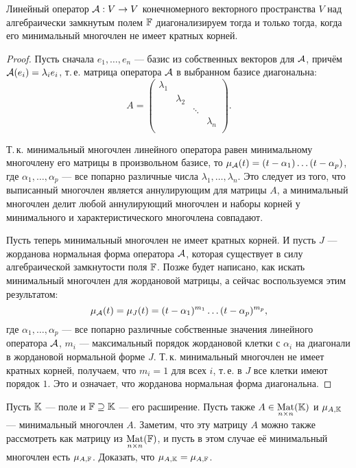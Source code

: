 \begin{theorem}
    Линейный оператор $\mathcal{A}: V \to V$ конечномерного векторного пространства $V$ над алгебраически замкнутым полем $\mathbb{F}$ диагонализируем тогда и только тогда, когда его минимальный многочлен не имеет кратных корней.
\end{theorem}

\begin{proof}
    Пусть сначала $e_1, \ldots, e_n$ --- базис из собственных векторов для $\mathcal{A}$, причём $\mathcal{A}(e_i) = \lambda_ie_i$, т.\,е. матрица оператора $\mathcal{A}$ в выбранном базисе диагональна:
    \[
        A =
        \begin{pmatrix}
            \lambda_1 &  &  & \\
             & \lambda_2 &  &  \\
             &  & \ddots &  \\
             &  &  & \lambda_n \\
        \end{pmatrix}.
    \]

    Т.\,к. минимальный многочлен линейного оператора равен минимальному многочлену его матрицы в произвольном базисе, то $\mu_{\mathcal{A}}(t) = (t - \alpha_1)\ldots(t - \alpha_p)$, где $\alpha_1, \ldots, \alpha_p$ --- все попарно различные числа $\lambda_1, \ldots, \lambda_n$. Это следует из того, что выписанный многочлен является аннулирующим для матрицы $A$, а минимальный многочлен делит любой аннулирующий многочлен и наборы корней у минимального и характеристического многочлена совпадают.

    Пусть теперь минимальный многочлен не имеет кратных корней. И пусть $J$ --- жорданова нормальная форма оператора $\mathcal{A}$, которая существует в силу алгебраической замкнутости поля $\mathbb{F}$. Позже будет написано, как искать минимальный многочлен для жордановой матрицы, а сейчас воспользуемся этим результатом:
    \[
        \mu_{\mathcal{A}}(t) = \mu_J(t) = (t - \alpha_1)^{m_1}\ldots(t - \alpha_p)^{m_p},
    \]
    где $\alpha_1, \ldots, \alpha_p$ --- все попарно различные собственные значения линейного оператора $\mathcal{A}$, $m_i$ --- максимальный порядок жордановой клетки с $\alpha_i$ на диагонали в жордановой нормальной форме $J$. Т.\,к. минимальный многочлен не имеет кратных корней, получаем, что $m_i = 1$ для всех $i$, т.\,е. в $J$ все клетки имеют порядок $1$. Это и означает, что жорданова нормальная форма диагональна.
\end{proof}

\begin{problem}
    Пусть $\mathbb{K}$ --- поле и $\mathbb{F} \supseteq \mathbb{K}$ --- его расширение. Пусть также $A \in \underset{n \times n}{\operatorname{Mat}}(\mathbb{K})$ и $\mu_{A, \mathbb{K}}$ --- минимальный многочлен $A$. Заметим, что эту матрицу $A$ можно также рассмотреть как матрицу из $\underset{n \times n}{\operatorname{Mat}}(\mathbb{F})$, и пусть в этом случае её минимальный многочлен есть $\mu_{A, \mathbb{F}}$. Доказать, что $\mu_{A, \mathbb{K}} = \mu_{A, \mathbb{F}}$.
\end{problem}

